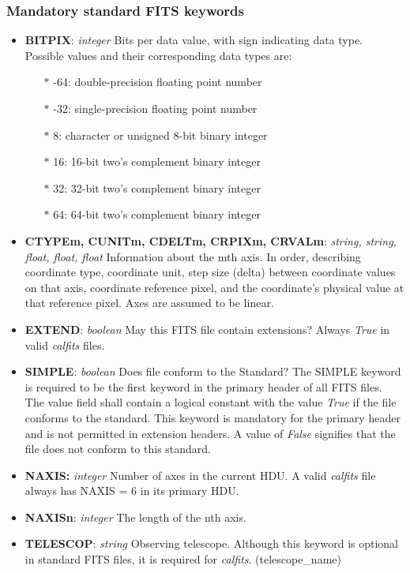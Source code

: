 \documentclass[11pt, oneside, english]{article}   	%
\begin{document}
	\subsubsection{Mandatory standard FITS keywords}
	\begin{itemize}
	\item{\textbf{BITPIX}: \emph{integer} Bits per data value, with sign indicating data type. Possible values and their corresponding data types are: 
	\begin{itemize}
	\item[$\ast$]{-64: double-precision floating point number}
	\item[$\ast$]{-32: single-precision floating point number}
	\item[$\ast$]{8: character or unsigned 8-bit binary integer}
	\item[$\ast$]{16: 16-bit two’s complement binary integer}
	\item[$\ast$]{32: 32-bit two’s complement binary integer}
	\item[$\ast$]{64: 64-bit two’s complement binary integer}
	\end{itemize}}
	\item{\textbf{CTYPEm, CUNITm, CDELTm, CRPIXm, CRVALm}: \emph{string, string, float, float, float} Information about the mth axis. In order, describing coordinate type, coordinate unit, step size (delta) between coordinate values on that axis, coordinate reference pixel, and the coordinate's physical value at that reference pixel. Axes are assumed to be linear.}
	\item{\textbf{EXTEND}: \emph{boolean} May this FITS file contain extensions? Always \emph{True} in valid \emph{calfits} files.}
	\item{\textbf{SIMPLE}: \emph{boolean} Does file conform to the Standard? The SIMPLE keyword is required to be the first keyword in
	the primary header of all FITS files. The value field shall contain a logical constant with the value \emph{True} if the file conforms to the standard.  This keyword is mandatory for the primary header and is not permitted in extension headers.  A value of \emph{False} signifies that the file does not conform to this standard.}
	\item{\textbf{NAXIS:} \emph{integer} Number of axes in the current HDU. A valid \emph{calfits} file always has NAXIS = 6 in its primary HDU.}
	\item{\textbf{NAXISn}: \emph{integer} The length of the nth axis.}
	\item{\textbf{TELESCOP}: \emph{string} Observing telescope. Although this keyword is optional in standard FITS files, it is required for \emph{calfits}. (telescope\_name)}
	\end{itemize}
\end{document}
